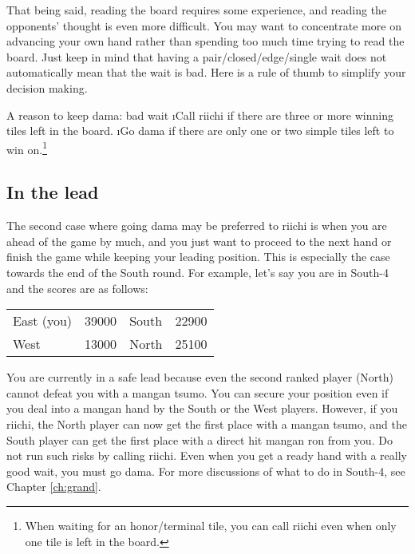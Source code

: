 \bigskip
That being said, reading the board requires some experience, and reading the opponents' thought is even more difficult. You may want to concentrate more on advancing your own hand rather than spending too much time trying to read the board. Just keep in mind that having a pair/closed/edge/single wait does not automatically mean that the wait is bad. Here is a rule of thumb to simplify your decision making.

\bigskip
\begin{itembox}[c]{A reason to keep {\jap dama}: bad wait}
\bi
\i Call riichi if there are three or more winning tiles left in the board.
\i Go {\jap dama} if there are only one or two simple tiles left to win on.\footnote{When waiting for an honor/terminal tile, you can call riichi even when only one tile is left in the board.}
\ei \vsps
\end{itembox}

\subsection{In the lead}\label{sec:lead}
The second case where going {\jap dama} may be preferred to riichi is when you are ahead of the game by much, and you just want to proceed to the next hand or finish the game while keeping your leading position. This is especially the case towards the end of the South round. For example, let's say you are in South-4 and the scores are as follows:

\begin{center}
\begin{tabular}{l r l r}
East (you) & 39000 & South & 22900\\
West & 13000 & North & 25100\\
\end{tabular}
\end{center}

You are currently in a safe lead because even the second ranked player (North) cannot defeat you with a {\jap mangan tsumo}. You can secure your position even if you deal into a {\jap mangan} hand by the South or the West players. However, if you riichi, the North player can now get the first place with a {\jap mangan tsumo}, and the South player can get the first place with a direct hit {\jap mangan ron} from you. Do not run such risks by calling riichi. Even when you get a ready hand with a really good wait, you must go {\jap dama}. For more discussions of what to do in South-4, see Chapter \ref{ch:grand}.

